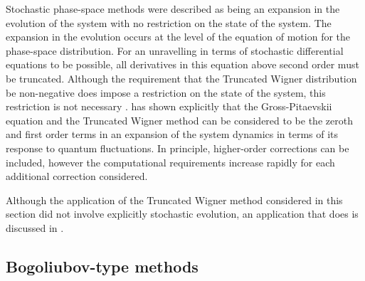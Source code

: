 Stochastic phase-space methods were described as being an expansion in the evolution of the system with no restriction on the state of the system.  The expansion in the evolution occurs at the level of the equation of motion for the phase-space distribution.  For an unravelling in terms of stochastic differential equations to be possible, all derivatives in this equation above second order must be truncated.  Although the requirement that the Truncated Wigner distribution be non-negative does impose a restriction on the state of the system, this restriction is not necessary \citep{Hush:2010}.  \citet{Polkovnikov:2003} has shown explicitly that the Gross-Pitaevskii equation and the Truncated Wigner method can be considered to be the zeroth and first order terms in an expansion of the system dynamics in terms of its response to quantum fluctuations.  In principle, higher-order corrections can be included, however the computational requirements increase rapidly for each additional correction considered.

Although the application of the Truncated Wigner method considered in this section did not involve explicitly stochastic evolution, an application that does is discussed in .

\subsection{Bogoliubov-type methods}
\label{BackgroundTheory:BogoliubovMethods}

